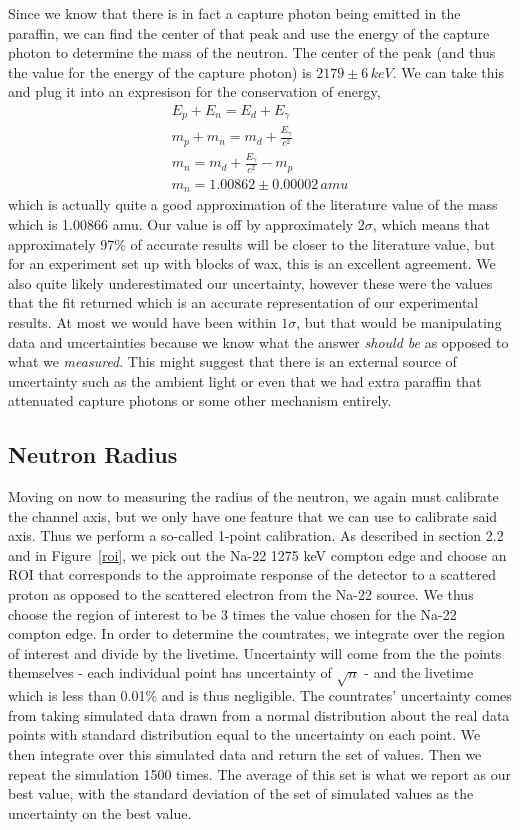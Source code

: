 \documentclass{article}
\begin{document}
  Since we know that there is in fact a capture photon being emitted in the paraffin, we can find the center of that peak and use the energy of the capture photon to determine the mass of the neutron.  The center of the peak (and thus the value for the energy of the capture photon) is $2179 \pm 6\, keV$.  We can take this and plug it into an expresison for the conservation of energy,
  \begin{gather*}
    E_p + E_n = E_d + E_\gamma \\
    m_p + m_n = m_d + \frac{E_\gamma}{c^2} \\
    m_n = m_d + \frac{E_\gamma}{c^2} - m_p \\
    m_n = 1.00862 \pm 0.00002 \, amu
  \end{gather*}
  which is actually quite a good approximation of the literature value of the mass which is 1.00866 amu.  Our value is off by approximately $2\sigma$, which means that approximately 97\% of accurate results will be closer to the literature value, but for an experiment set up with blocks of wax, this is an excellent agreement.  We also quite likely underestimated our uncertainty, however these were the values that the fit returned which is an accurate representation of our experimental results.  At most we would have been within $1\sigma$, but that would be manipulating data and uncertainties because we know what the answer \textit{should be} as opposed to what we \textit{measured}.  This might suggest that there is an external source of uncertainty such as the ambient light or even that we had extra paraffin that attenuated capture photons or some other mechanism entirely.

  \subsection{Neutron Radius}
  Moving on now to measuring the radius of the neutron, we again must calibrate the channel axis, but we only have one feature that we can use to calibrate said axis.  Thus we perform a so-called 1-point calibration.  As described in section 2.2 and in Figure~\ref{roi}, we pick out the Na-22 1275 keV compton edge and choose an ROI that corresponds to the approimate response of the detector to a scattered proton as opposed to the scattered electron from the Na-22 source.  We thus choose the region of interest to be 3 times the value chosen for the Na-22 compton edge.  In order to determine the countrates, we integrate over the region of interest and divide by the livetime.  Uncertainty will come from the the points themselves - each individual point has uncertainty of $\sqrt{n}$ - and the livetime which is less than 0.01\% and is thus negligible.  The countrates' uncertainty comes from taking simulated data drawn from a normal distribution about the real data points with standard distribution equal to the uncertainty on each point.  We then integrate over this simulated data and return the set of values.  Then we repeat the simulation 1500 times.  The average of this set is what we report as our best value, with the standard deviation of the set of simulated values as the uncertainty on the best value.
\end{document}
